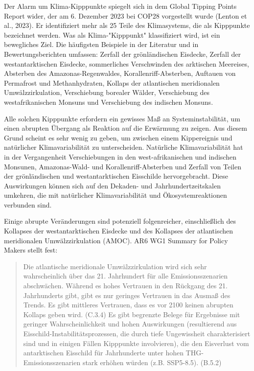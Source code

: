 \documentclass[12pt,paper=a4,DIV=12,parskip=never,chapterprefix=false,headings=standardclasses]{scrreprt}
\begin{document}
Der Alarm um Klima-Kipppunkte spiegelt sich in dem Global Tipping Points Report wider, der am 6. Dezember 2023 bei COP28 vorgestellt wurde (Lenton et al., 2023). Er identifiziert mehr als 25 Teile des Klimasystems, die als Kipppunkte bezeichnet werden. Was als Klima-"Kipppunkt" klassifiziert wird, ist ein bewegliches Ziel. Die häufigsten Beispiele in der Literatur und in Bewertungsberichten umfassen: Zerfall der grönländischen Eisdecke, Zerfall der westantarktischen Eisdecke, sommerliches Verschwinden des arktischen Meereises, Absterben des Amazonas-Regenwaldes, Korallenriff-Absterben, Auftauen von Permafrost und Methanhydraten, Kollaps der atlantischen meridionalen Umwälzzirkulation, Verschiebung borealer Wälder, Verschiebung des westafrikanischen Monsuns und Verschiebung des indischen Monsuns.

Alle solchen Kipppunkte erfordern ein gewisses Maß an Systeminstabilität, um einen abrupten Übergang als Reaktion auf die Erwärmung zu zeigen. Aus diesem Grund scheint es sehr wenig zu geben, um zwischen einem Kippereignis und natürlicher Klimavariabilität zu unterscheiden. Natürliche Klimavariabilität hat in der Vergangenheit Verschiebungen in den west-afrikanischen und indischen Monsunen, Amazonas-Wald- und Korallenriff-Absterben und Zerfall von Teilen der grönländischen und westantarktischen Eisschilde hervorgebracht. Diese Auswirkungen können sich auf den Dekaden- und Jahrhundertzeitskalen umkehren, die mit natürlicher Klimavariabilität und Ökosystemreaktionen verbunden sind.

Einige abrupte Veränderungen sind potenziell folgenreicher, einschließlich des Kollapses der westantarktischen Eisdecke und des Kollapses der atlantischen meridionalen Umwälzzirkulation (AMOC). AR6 WG1 Summary for Policy Makers stellt fest:

\begin{quote}
Die atlantische meridionale Umwälzzirkulation wird sich sehr wahrscheinlich über das 21. Jahrhundert für alle Emissionsszenarien abschwächen. Während es hohes Vertrauen in den Rückgang des 21. Jahrhunderts gibt, gibt es nur geringes Vertrauen in das Ausmaß des Trends. Es gibt mittleres Vertrauen, dass es vor 2100 keinen abrupten Kollaps geben wird. (C.3.4)
Es gibt begrenzte Belege für Ergebnisse mit geringer Wahrscheinlichkeit und hohen Auswirkungen (resultierend aus Eisschild-Instabilitätsprozessen, die durch tiefe Ungewissheit charakterisiert sind und in einigen Fällen Kipppunkte involvieren), die den Eisverlust vom antarktischen Eisschild für Jahrhunderte unter hohen THG-Emissionsszenarien stark erhöhen würden (z.B. SSP5-8.5). (B.5.2)
\end{quote}
\end{document}
